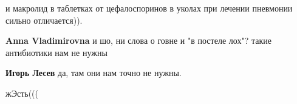 \begin{itemize}
\begin{itemize}
и макролид в таблетках от цефалоспоринов в уколах при лечении пневмонии сильно отличается)).

\textbf{Anna Vladimirovna} и шо, ни слова о говне и "в постеле лох"? такие антибиотики нам не нужны

\textbf{Игорь Лесев} да, там они нам точно не нужны.

\end{itemize} %

жЭсть(((

\end{itemize} %
